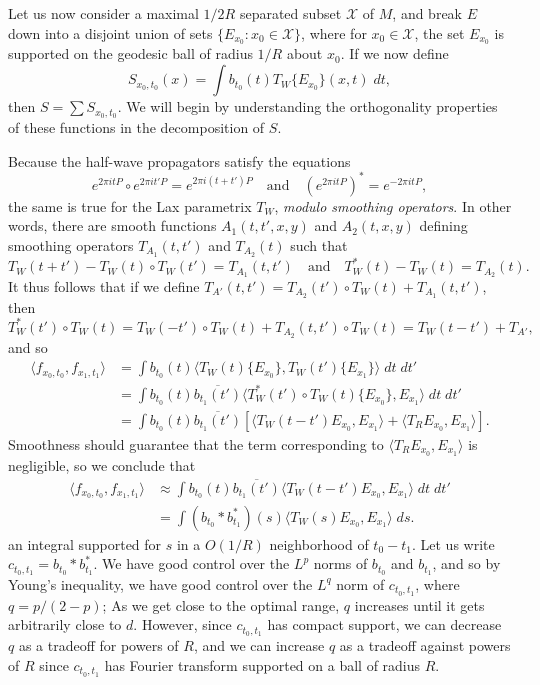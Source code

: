 Let us now consider a maximal $1/2R$ separated subset $\mathcal{X}$ of $M$, and break $E$ down into a disjoint union of sets $\{ E_{x_0}: x_0 \in \mathcal{X} \}$, where for $x_0 \in \mathcal{X}$, the set $E_{x_0}$ is supported on the geodesic ball of radius $1/R$ about $x_0$. If we now define
%
\[ S_{x_0,t_0}(x) = \int b_{t_0}(t) T_W \{ E_{x_0} \}(x,t)\; dt, \]
%
then $S = \sum S_{x_0,t_0}$. We will begin by understanding the orthogonality properties of these functions in the decomposition of $S$.

Because the half-wave propagators satisfy the equations
%
\[ e^{2 \pi i t P} \circ e^{2 \pi i t' P} = e^{2 \pi i (t + t') P} \quad\text{and}\quad (e^{2 \pi i t P})^* = e^{-2 \pi i t P}, \]
%
the same is true for the Lax parametrix $T_W$, \emph{modulo smoothing operators}. In other words, there are smooth functions $A_1(t,t',x,y)$ and $A_2(t,x,y)$ defining smoothing operators $T_{A_1}(t,t')$ and $T_{A_2}(t)$ such that
%
\[ T_W(t+t') - T_W(t) \circ T_W(t') = T_{A_1}(t,t') \quad\text{and}\quad T_W^*(t) - T_W(t) = T_{A_2}(t). \]
%
It thus follows that if we define $T_{A'}(t,t') = T_{A_2}(t') \circ T_W(t) + T_{A_1}(t,t')$, then
%
\[ T_W^*(t') \circ T_W(t) = T_W(-t') \circ T_W(t) + T_{A_2}(t,t') \circ T_W(t) = T_W(t-t') + T_{A'}, \]
%
and so
%
\begin{align*}
    \langle f_{x_0,t_0}, f_{x_1,t_1} \rangle &= \int b_{t_0}(t) \langle T_W(t) \{ E_{x_0} \}, T_W(t') \{ E_{x_1} \} \rangle\; dt\; dt'\\
    &= \int b_{t_0}(t) \overline{b_{t_1}(t')} \langle T_W^*(t') \circ T_W(t) \{ E_{x_0} \}, E_{x_1} \rangle\; dt\; dt'\\
    &= \int b_{t_0}(t) \overline{b_{t_1}(t')} \left[ \langle T_W(t-t') E_{x_0}, E_{x_1} \rangle + \langle T_R E_{x_0}, E_{x_1} \rangle \right].
\end{align*}
%
Smoothness should guarantee that the term corresponding to $\langle T_R E_{x_0}, E_{x_1} \rangle$ is negligible, so we conclude that
%
\begin{align*}
    \langle f_{x_0,t_0}, f_{x_1,t_1} \rangle &\approx \int b_{t_0}(t) \overline{b_{t_1}(t')} \langle T_W(t-t') E_{x_0}, E_{x_1} \rangle\; dt\; dt'\\
    &= \int (b_{t_0} * b_{t_1}^*)(s) \langle T_W(s) E_{x_0}, E_{x_1} \rangle\; ds.
\end{align*}
%
an integral supported for $s$ in a $O(1/R)$ neighborhood of $t_0-t_1$. Let us write $c_{t_0,t_1} = b_{t_0} * b_{t_1}^*$. We have good control over the $L^p$ norms of $b_{t_0}$ and $b_{t_1}$, and so by Young's inequality, we have good control over the $L^q$ norm of $c_{t_0,t_1}$, where $q = p/(2-p)$; As we get close to the optimal range, $q$ increases until it gets arbitrarily close to $d$. However, since $c_{t_0,t_1}$ has compact support, we can decrease $q$ as a tradeoff for powers of $R$, and we can increase $q$ as a tradeoff against powers of $R$ since $c_{t_0,t_1}$ has Fourier transform supported on a ball of radius $R$.

